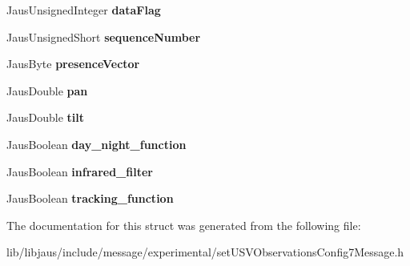 \begin{DoxyCompactItemize}
\item 
\hypertarget{struct_set_u_s_v_observations_config7_message_struct_ae2c08627cf15f6a6e3ed6b51b1167d69}{\-Jaus\-Unsigned\-Integer {\bfseries data\-Flag}}\label{struct_set_u_s_v_observations_config7_message_struct_ae2c08627cf15f6a6e3ed6b51b1167d69}

\item 
\hypertarget{struct_set_u_s_v_observations_config7_message_struct_a4318c55ef66fc60d2cd4bf5777b776c9}{\-Jaus\-Unsigned\-Short {\bfseries sequence\-Number}}\label{struct_set_u_s_v_observations_config7_message_struct_a4318c55ef66fc60d2cd4bf5777b776c9}

\item 
\hypertarget{struct_set_u_s_v_observations_config7_message_struct_a0039cfb8aa0cbe9f571593fd5de2f9e7}{\-Jaus\-Byte {\bfseries presence\-Vector}}\label{struct_set_u_s_v_observations_config7_message_struct_a0039cfb8aa0cbe9f571593fd5de2f9e7}

\item 
\hypertarget{struct_set_u_s_v_observations_config7_message_struct_aaf5024ed0d610157c912de57e6664a0c}{\-Jaus\-Double {\bfseries pan}}\label{struct_set_u_s_v_observations_config7_message_struct_aaf5024ed0d610157c912de57e6664a0c}

\item 
\hypertarget{struct_set_u_s_v_observations_config7_message_struct_af5bf384d589144fe803fb0bfd8f07c30}{\-Jaus\-Double {\bfseries tilt}}\label{struct_set_u_s_v_observations_config7_message_struct_af5bf384d589144fe803fb0bfd8f07c30}

\item 
\hypertarget{struct_set_u_s_v_observations_config7_message_struct_a07697f15bf6f1adc3bd8063f2f2b0b4d}{\-Jaus\-Boolean {\bfseries day\-\_\-night\-\_\-function}}\label{struct_set_u_s_v_observations_config7_message_struct_a07697f15bf6f1adc3bd8063f2f2b0b4d}

\item 
\hypertarget{struct_set_u_s_v_observations_config7_message_struct_a12f8e071c13a37e14491d01f5caabe7d}{\-Jaus\-Boolean {\bfseries infrared\-\_\-filter}}\label{struct_set_u_s_v_observations_config7_message_struct_a12f8e071c13a37e14491d01f5caabe7d}

\item 
\hypertarget{struct_set_u_s_v_observations_config7_message_struct_a7c3c437354ee59673fac060dd37ca1f4}{\-Jaus\-Boolean {\bfseries tracking\-\_\-function}}\label{struct_set_u_s_v_observations_config7_message_struct_a7c3c437354ee59673fac060dd37ca1f4}

\end{DoxyCompactItemize}


\-The documentation for this struct was generated from the following file\-:\begin{DoxyCompactItemize}
\item 
lib/libjaus/include/message/experimental/set\-U\-S\-V\-Observations\-Config7\-Message.\-h\end{DoxyCompactItemize}

